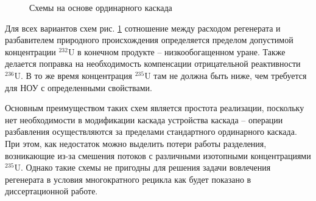 \begin{figure}[ht]
  \caption{Схемы на основе ординарного каскада}\label{fig:diagram1}
\end{figure}

Для всех вариантов схем рис. \ref{fig:diagram1} сотношение между расходом регенерата и разбавителем природного происхождения определяется пределом допустимой концентрации $^{232}$U в конечном продукте -- низкообогащенном уране. Также делается поправка на необходимость компенсации отрицательной реактивности $^{236}$U. В то же время концентрация $^{235}$U там не должна быть ниже, чем требуется для НОУ с определенными свойствами.

Основным преимуществом таких схем является простота реализации, поскольку нет необходимости в модификации каскада устройства каскада -- операции разбавления осуществляются за пределами стандартного ординарного каскада. При этом, как недостаток можно выделить потери работы разделения, возникающие из-за смешения потоков с различными изотопными концентрациями $^{235}$U. 
Однако такие схемы не пригодны для решения задачи вовлечения регенерата в условия многократного рецикла как будет показано в диссертационной работе.

